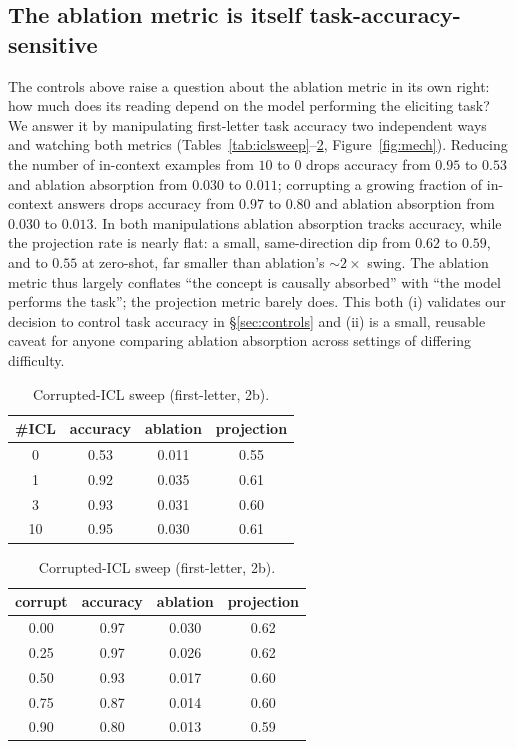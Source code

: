 \documentclass[11pt]{article}
\theoremstyle{definition}
\begin{document}
\subsection{The ablation metric is itself task-accuracy-sensitive}\label{sec:mech}
The controls above raise a question about the ablation metric in its own right: how much does its reading
depend on the model performing the eliciting task? We answer it by manipulating first-letter task accuracy
two independent ways and watching both metrics (Tables~\ref{tab:iclsweep}--\ref{tab:corrupt},
Figure~\ref{fig:mech}). Reducing the number of in-context examples from $10$ to $0$ drops accuracy from
$0.95$ to $0.53$ and ablation absorption from $0.030$ to $0.011$; corrupting a growing fraction of
in-context answers drops accuracy from $0.97$ to $0.80$ and ablation absorption from $0.030$ to $0.013$. In
both manipulations ablation absorption tracks accuracy, while the projection rate is nearly flat: a small,
same-direction dip from $0.62$ to $0.59$, and to $0.55$ at zero-shot, far smaller than ablation's
${\sim}2\times$ swing. The ablation metric thus largely conflates ``the concept is causally absorbed'' with
``the model performs the task''; the projection metric barely does. This both (i) validates our decision to control task
accuracy in \S\ref{sec:controls} and (ii) is a small, reusable caveat for anyone comparing ablation
absorption across settings of differing difficulty.

\begin{table}[t]
  \centering
  \begin{minipage}[t]{0.48\textwidth}\centering
  \caption{ICL-count sweep (first-letter, 2b).}\label{tab:iclsweep}
  \small
  \begin{tabular}{cccc}
    \toprule
    \#ICL & accuracy & ablation & projection \\
    \midrule
    0  & 0.53 & 0.011 & 0.55 \\
    1  & 0.92 & 0.035 & 0.61 \\
    3  & 0.93 & 0.031 & 0.60 \\
    10 & 0.95 & 0.030 & 0.61 \\
    \bottomrule
  \end{tabular}
  \end{minipage}\hfill
  \begin{minipage}[t]{0.48\textwidth}\centering
  \caption{Corrupted-ICL sweep (first-letter, 2b).}\label{tab:corrupt}
  \small
  \begin{tabular}{cccc}
    \toprule
    corrupt & accuracy & ablation & projection \\
    \midrule
    0.00 & 0.97 & 0.030 & 0.62 \\
    0.25 & 0.97 & 0.026 & 0.62 \\
    0.50 & 0.93 & 0.017 & 0.60 \\
    0.75 & 0.87 & 0.014 & 0.60 \\
    0.90 & 0.80 & 0.013 & 0.59 \\
    \bottomrule
  \end{tabular}
  \end{minipage}
\end{table}
\end{document}
